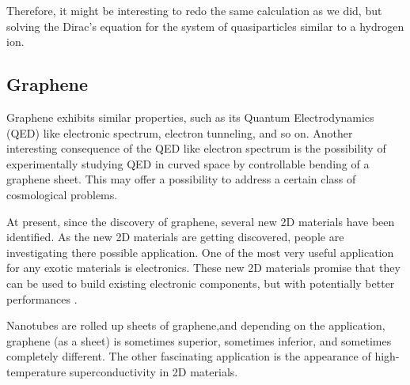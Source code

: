 Therefore, it might be interesting to redo the same calculation as we did, but solving the Dirac's equation for the system of quasiparticles similar to a hydrogen ion. 

\subsection{Graphene}
Graphene exhibits similar properties\cite{Graphene0}, such as its Quantum Electrodynamics (QED) like electronic spectrum, electron tunneling, and so on. Another interesting consequence of the QED like electron spectrum is the possibility of experimentally studying QED in curved space by controllable bending of a graphene sheet. This may offer a possibility to address a certain class of cosmological problems. 

At present, since the discovery of graphene,
several new 2D materials have
been identified\cite{Many2DMaterials}. 
As the new 2D materials are getting discovered, people are investigating there possible application. One of the most very useful application for any exotic materials is electronics. These new 2D materials promise that they can be used to build existing electronic components, but with potentially better performances \cite{2DEJour1}\cite{2DEJour2}.

Nanotubes are rolled up sheets of graphene,and depending on the application, graphene (as a sheet) is sometimes superior, sometimes inferior, and sometimes completely different. The other fascinating application is the appearance of high-temperature superconductivity in 2D materials\cite{2DSuper}.

